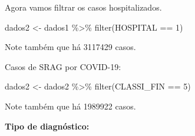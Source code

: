 \documentclass[
]{article}
\newenvironment{Shaded}{\begin{snugshade}}{\end{snugshade}}
\newcommand{\DecValTok}[1]{\textcolor[rgb]{0.00,0.00,0.81}{#1}}
\newcommand{\FunctionTok}[1]{\textcolor[rgb]{0.00,0.00,0.00}{#1}}
\newcommand{\NormalTok}[1]{#1}
\newcommand{\OtherTok}[1]{\textcolor[rgb]{0.56,0.35,0.01}{#1}}
\newcommand{\SpecialCharTok}[1]{\textcolor[rgb]{0.00,0.00,0.00}{#1}}
\begin{document}
Agora vamos filtrar os casos hospitalizados.

\begin{Shaded}
\begin{Highlighting}[]
\NormalTok{dados2 }\OtherTok{\textless{}{-}}\NormalTok{ dados1 }\SpecialCharTok{\%\textgreater{}\%} 
  \FunctionTok{filter}\NormalTok{(HOSPITAL }\SpecialCharTok{==} \DecValTok{1}\NormalTok{)}
\end{Highlighting}
\end{Shaded}

Note também que há 3117429 casos.

Casos de SRAG por COVID-19:

\begin{Shaded}
\begin{Highlighting}[]
\NormalTok{dados2 }\OtherTok{\textless{}{-}}\NormalTok{ dados2 }\SpecialCharTok{\%\textgreater{}\%} 
  \FunctionTok{filter}\NormalTok{(CLASSI\_FIN }\SpecialCharTok{==} \DecValTok{5}\NormalTok{)}
\end{Highlighting}
\end{Shaded}

Note também que há 1989922 casos.

\textbf{Tipo de diagnóstico:}
\end{document}
